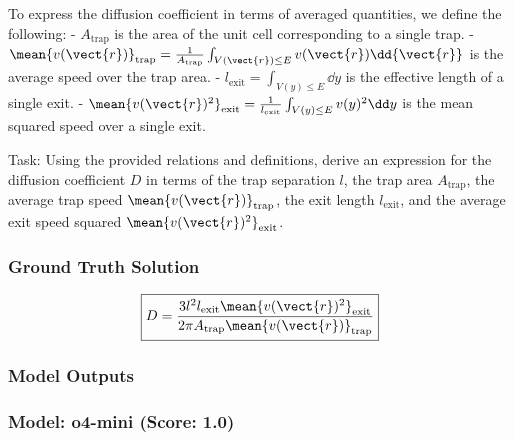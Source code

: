 \documentclass[10pt]{article}
\begin{document}
To express the diffusion coefficient in terms of averaged quantities, we define the following:
- $A_{\text{trap}}$ is the area of the unit cell corresponding to a single trap.
- $\mean{v(\vect{r})}_{\text{trap}} = \frac{1}{A_{\text{trap}}} \int_{V(\vect{r}) \leq E} v(\vect{r}) \dd{\vect{r}}$ is the average speed over the trap area.
- $l_{\text{exit}} = \int_{V(y) \leq E} \dd y$ is the effective length of a single exit.
- $\mean{v(\vect{r})^2}_{\text{exit}} = \frac{1}{l_{\text{exit}}} \int_{V(y) \leq E} v(y)^2 \dd y$ is the mean squared speed over a single exit.

Task:
Using the provided relations and definitions, derive an expression for the diffusion coefficient $D$ in terms of the trap separation $l$, the trap area $A_{\text{trap}}$, the average trap speed $\mean{v(\vect{r})}_{\text{trap}}$, the exit length $l_{\text{exit}}$, and the average exit speed squared $\mean{v(\vect{r})^2}_{\text{exit}}$.

\subsubsection*{Ground Truth Solution}
\[ \boxed{D = \frac{3 l^2 l_{\text{exit}} \mean{v(\vect{r})^2}_{\text{exit}}}{2\pi A_{\text{trap}} \mean{v(\vect{r})}_{\text{trap}}}} \]

\subsubsection*{Model Outputs}
\subsubsection*{Model: o4-mini (Score: 1.0)}
\end{document}
